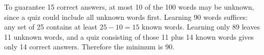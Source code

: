 To guarantee 15 correct answers, at most 10 of the 100 words may be unknown, since a quiz could include all unknown words first. Learning 90 words suffices: any set of 25 contains at least $25-10=15$ known words. Learning only 89 leaves 11 unknown words, and a quiz consisting of those 11 plus 14 known words gives only 14 correct answers. Therefore the minimum is $\boxed{90}$.
